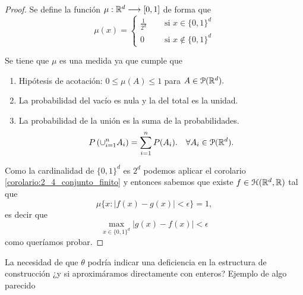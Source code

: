 \begin{proof}
    Se define la función $\mu : \mathbb{R}^d \longrightarrow [0,1]$ de forma que 
    \begin{equation}
        \mu(x) = 
      \left \{
    \begin{aligned}
      \frac{1}{2^d} \quad &\text{ si } x \in \{0,1\}^d \\
      0 \quad & \text{ si } x \notin \{0,1\}^d 
    \end{aligned}
  \right .
    \end{equation}

    Se tiene que $\mu$ es una medida ya que cumple que 
    \begin{enumerate}
        \item Hipótesis de acotación: $0 \leq \mu(A) \leq 1$ para $A \in \mathcal{P}(\mathbb{R}^d).$
        \item La probabilidad del vacío es nula y la del  total es la unidad. 
        \item La probabilidad de la unión es la suma de la probabilidades. 
        \begin{equation}
            P\left(
                \cup_{i=1}^n A_i
            \right)
            = \sum_{i=1}^n P(A_i).
            \quad
            \forall A_i \in  \mathcal{P}(\mathbb{R}^d).
        \end{equation}
    \end{enumerate}  

    Como la cardinalidad de $\{0,1\}^d$ es $2^d$
    podemos aplicar el corolario \ref{corolario:2_4_conjunto_finito}
    y entonces sabemos que  existe $f\in \mathcal{H}(\mathbb{R}^d,\mathbb{R})$ tal que 
    \begin{equation}
            \mu\{ 
                x:
                |f(x) - g(x)| 
                < \epsilon
            \}
            = 1,
    \end{equation} 
    es decir que 
    \begin{equation}
        \max_{x \in \{ 0,1\}^d} |g(x) - f(x)|
        < \epsilon
    \end{equation}
    como queríamos probar. 
\end{proof}
\textcolor{dark_green}{La necesidad de que $\theta$ podría indicar una deficiencia en la estructura de construcción ¿y si aproximáramos directamente con enteros?  
Ejemplo de algo parecido  \cite{Wang_2022}
}



